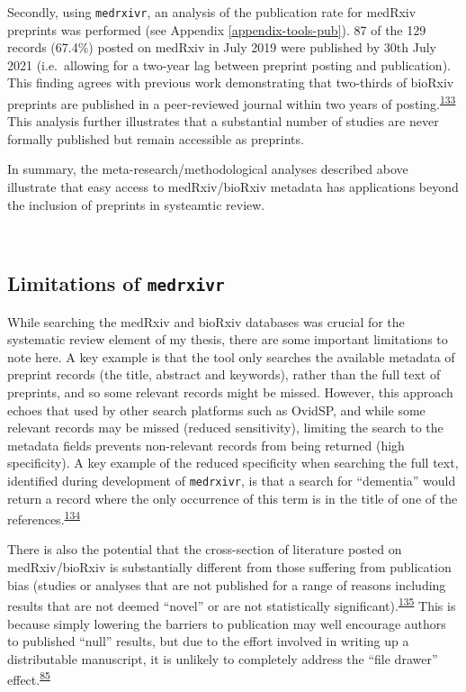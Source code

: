 \documentclass[a4paper, twoside]{templates/ociamthesis}
\begin{document}
Secondly, using \texttt{medrxivr}, an analysis of the publication rate for medRxiv preprints was performed (see Appendix \ref{appendix-tools-pub}). 87 of the 129 records (67.4\%) posted on medRxiv in July 2019 were published by 30th July 2021 (i.e.~allowing for a two-year lag between preprint posting and publication). This finding agrees with previous work demonstrating that two-thirds of bioRxiv preprints are published in a peer-reviewed journal within two years of posting.\textsuperscript{\protect\hyperlink{ref-abdill2019popularity}{133}} This analysis further illustrates that a substantial number of studies are never formally published but remain accessible as preprints.

In summary, the meta-research/methodological analyses described above illustrate that easy access to medRxiv/bioRxiv metadata has applications beyond the inclusion of preprints in systeamtic review.

~

\hypertarget{medrxivr-limitations}{%
\subsection{\texorpdfstring{Limitations of \texttt{medrxivr}}{Limitations of medrxivr}}\label{medrxivr-limitations}}

While searching the medRxiv and bioRxiv databases was crucial for the systematic review element of my thesis, there are some important limitations to note here. A key example is that the tool only searches the available metadata of preprint records (the title, abstract and keywords), rather than the full text of preprints, and so some relevant records might be missed. However, this approach echoes that used by other search platforms such as OvidSP, and while some relevant records may be missed (reduced sensitivity), limiting the search to the metadata fields prevents non-relevant records from being returned (high specificity). A key example of the reduced specificity when searching the full text, identified during development of \texttt{medrxivr}, is that a search for ``dementia'' would return a record where the only occurrence of this term is in the title of one of the references.\textsuperscript{\protect\hyperlink{ref-bong2019}{134}}

There is also the potential that the cross-section of literature posted on medRxiv/bioRxiv is substantially different from those suffering from publication bias (studies or analyses that are not published for a range of reasons including results that are not deemed ``novel'' or are not statistically significant).\textsuperscript{\protect\hyperlink{ref-song2010}{135}} This is because simply lowering the barriers to publication may well encourage authors to published ``null'' results, but due to the effort involved in writing up a distributable manuscript, it is unlikely to completely address the ``file drawer'' effect.\textsuperscript{\protect\hyperlink{ref-rosenthal1979}{85}}
\end{document}
